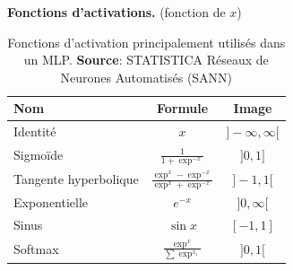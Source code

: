 \begin{table}
 \centering
 \textbf{Fonctions d'activations.} (fonction de $x$)\\
 \begin{tabular}{|l|c|c|}
  Nom & Formule & Image\\
  \hline
  Identité & $x$ & $]-\infty,\infty[$\\
  \hline
  Sigmoïde & $\frac{1}{1+\exp^{-x}}$ & $]0,1]$\\
  \hline
  Tangente hyperbolique & $\frac{\exp^{x}-\exp^{-x}}{\exp^{x}+\exp^{-x}}$ & $]-1,1[$\\
  \hline
  Exponentielle & $e^{-x}$ & $]0,\infty[$\\
  \hline
  Sinus & $\sin{x}$ & $[-1,1]$\\
  \hline
  Softmax & $\frac{\exp^{x}}{\sum{\exp^{x_i}}}$ & $]0,1[$\\
  \hline
 \end{tabular}
 \caption{Fonctions d'activation principalement utilisés dans un MLP. \textbf{Source}: STATISTICA Réseaux de Neurones Automatisés (SANN)\cite{statistica}}
 \label{mlpfonc}
\end{table}
